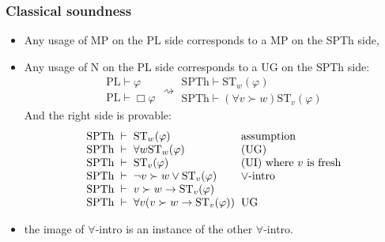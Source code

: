 \documentclass[xcolor=x11names]{beamer}
\newcommand{\past}{\succ}
\newcommand{\lrule}[3][c]{\begin{array}{#1} #2  \\  \hline #3 \end{array}}
\newcommand{\lthen}{\rightarrow}
\newcommand{\forallp}[1]{(\forall #1)}
\newenvironment{tomb}[2][.1]{\arraycolsep=#1cm\begin{array}{#2}}{\end{array}}
\begin{document}
\begin{frame}[t]
\frametitle{Classical soundness}
\footnotesize
\begin{itemize}
\item Any usage of MP on the PL side corresponds to a MP on the SPTh side,
\item Any usage of N on the PL side corresponds to a UG on the SPTh side:
\[ \lrule[l]{\mathrm {PL}\vdash \varphi}{\mathrm{PL}\vdash \Box \varphi} \rightsquigarrow \lrule[l]{\mathrm {SPTh}\vdash \mathrm{ST}_w(\varphi)}{\mathrm{SPTh}\vdash \forallp{v \past w} \mathrm{ST}_v(\varphi)}\]
And the right side is provable:
\[\begin{tomb}{rcll}
   \mathrm{SPTh} &\vdash & \mathrm{ST}_w(\varphi) &\textup{assumption}
\\ \mathrm{SPTh} &\vdash & \forall w\mathrm{ST}_w(\varphi) &\textup{(UG)}
\\ \mathrm{SPTh} &\vdash & \mathrm{ST}_v(\varphi) &\textup{(UI) where $v$ is fresh}
\\ \mathrm{SPTh} &\vdash & \lnot v\past w \lor \mathrm{ST}_v(\varphi) &\textup{$\lor$-intro}
\\ \mathrm{SPTh} &\vdash & v\past w \lthen \mathrm{ST}_v(\varphi) &\textup{}
\\ \mathrm{SPTh} &\vdash & \forall v (v\past w \lthen \mathrm{ST}_v(\varphi)) &\textup{UG}
\end{tomb}\]
\item the image of $\forall$-intro is an instance of the other $\forall$-intro.
\end{itemize}
\end{frame}
\end{document}
